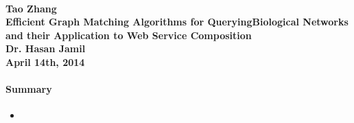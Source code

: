 \documentclass[12pt]{article}
\begin{document}
\paragraph{Tao Zhang\\Efficient Graph Matching Algorithms for QueryingBiological Networks and their Application to Web Service Composition\\Dr. Hasan Jamil\\April 14th, 2014}

\paragraph{Summary}

\begin{itemize}
\item 

\end{itemize}
\end{document}
